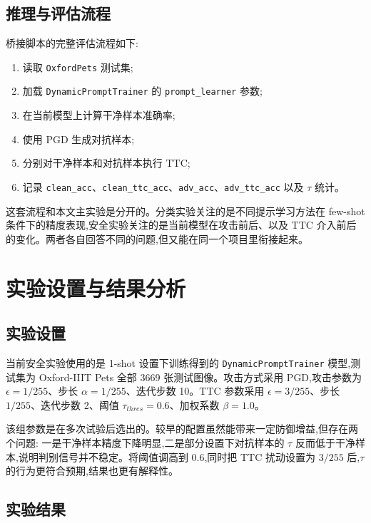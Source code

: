 \subsection{推理与评估流程}

桥接脚本的完整评估流程如下:

\begin{enumerate}
\item 读取 \texttt{OxfordPets} 测试集;
\item 加载 \texttt{DynamicPromptTrainer} 的 \texttt{prompt\_learner} 参数;
\item 在当前模型上计算干净样本准确率;
\item 使用 PGD 生成对抗样本;
\item 分别对干净样本和对抗样本执行 TTC;
\item 记录 \texttt{clean\_acc}、\texttt{clean\_ttc\_acc}、\texttt{adv\_acc}、\texttt{adv\_ttc\_acc} 以及 \(\tau\) 统计。
\end{enumerate}

这套流程和本文主实验是分开的。分类实验关注的是不同提示学习方法在 few-shot 条件下的精度表现,安全实验关注的是当前模型在攻击前后、以及 TTC 介入前后的变化。两者各自回答不同的问题,但又能在同一个项目里衔接起来。

\section{实验设置与结果分析}

\subsection{实验设置}

当前安全实验使用的是 1-shot 设置下训练得到的 \texttt{DynamicPromptTrainer} 模型,测试集为 Oxford-IIIT Pets 全部 3669 张测试图像。攻击方式采用 PGD,攻击参数为 \(\epsilon = 1/255\)、步长 \(\alpha = 1/255\)、迭代步数 10。TTC 参数采用 \(\epsilon = 3/255\)、步长 \(1/255\)、迭代步数 2、阈值 \(\tau_{thres}=0.6\)、加权系数 \(\beta = 1.0\)。

该组参数是在多次试验后选出的。较早的配置虽然能带来一定防御增益,但存在两个问题: 一是干净样本精度下降明显,二是部分设置下对抗样本的 \(\tau\) 反而低于干净样本,说明判别信号并不稳定。将阈值调高到 0.6,同时把 TTC 扰动设置为 \(3/255\) 后,\(\tau\) 的行为更符合预期,结果也更有解释性。

\subsection{实验结果}

